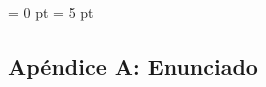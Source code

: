 \documentclass[a4paper]{article}
\begin{document}

\parindent = 0 pt
\parskip = 5 pt

\addtolength{\topmargin}{-1cm}
\addtolength{\textheight}{1cm}

\newcommand{\real}{\mathbb{R}}
\newcommand{\kknn}{k}
\newcommand{\kpca}{\alpha}
\newcommand{\kkfold}{K}


\subsection*{Apéndice A: Enunciado}
\end{document}
